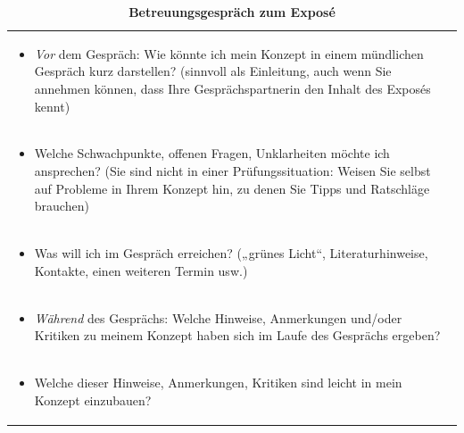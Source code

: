 \documentclass[]{book}
\providecommand{\tightlist}{%
  \setlength{\itemsep}{0pt}\setlength{\parskip}{0pt}}
\theoremstyle{definition}
\theoremstyle{definition}
\theoremstyle{definition}
\theoremstyle{remark}
\begin{document}
\begin{longtable}[]{@{}l@{}}
\caption{\textbf{\label{tab:betreuung} Betreuungsgespräch zum
Exposé}}\tabularnewline
\toprule
\begin{minipage}[t]{0.97\columnwidth}\raggedright\strut
\begin{itemize}
\tightlist
\item
  \emph{Vor} dem Gespräch: Wie könnte ich mein Konzept in einem
  mündlichen Gespräch kurz darstellen? (sinnvoll als Einleitung, auch
  wenn Sie annehmen können, dass Ihre Gesprächspartnerin den Inhalt des
  Exposés kennt)
\end{itemize}\strut
\end{minipage}\tabularnewline
\begin{minipage}[t]{0.97\columnwidth}\raggedright\strut
\begin{itemize}
\tightlist
\item
  Welche Schwachpunkte, offenen Fragen, Unklarheiten möchte ich
  ansprechen? (Sie sind nicht in einer Prüfungssituation: Weisen Sie
  selbst auf Probleme in Ihrem Konzept hin, zu denen Sie Tipps und
  Ratschläge brauchen)
\end{itemize}\strut
\end{minipage}\tabularnewline
\begin{minipage}[t]{0.97\columnwidth}\raggedright\strut
\begin{itemize}
\tightlist
\item
  Was will ich im Gespräch erreichen? („grünes Licht``,
  Literaturhinweise, Kontakte, einen weiteren Termin usw.)
\end{itemize}\strut
\end{minipage}\tabularnewline
\begin{minipage}[t]{0.97\columnwidth}\raggedright\strut
\begin{itemize}
\tightlist
\item
  \emph{Während} des Gesprächs: Welche Hinweise, Anmerkungen und/oder
  Kritiken zu meinem Konzept haben sich im Laufe des Gesprächs ergeben?
\end{itemize}\strut
\end{minipage}\tabularnewline
\begin{minipage}[t]{0.97\columnwidth}\raggedright\strut
\begin{itemize}
\tightlist
\item
  Welche dieser Hinweise, Anmerkungen, Kritiken sind leicht in mein
  Konzept einzubauen?
\end{itemize}\strut
\end{minipage}\tabularnewline

\end{longtable}
\end{document}

